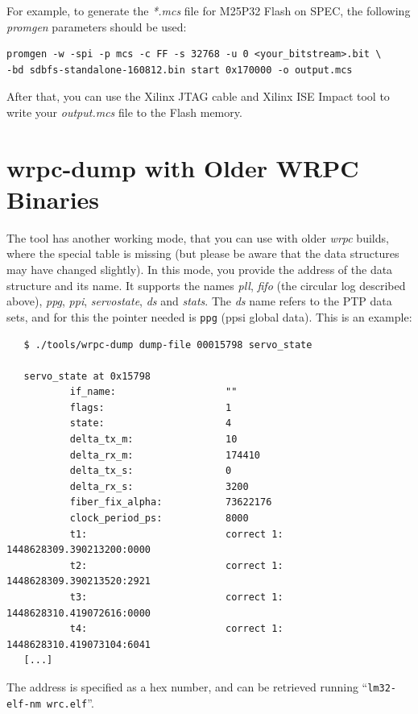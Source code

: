 \documentclass[a4paper, 12pt]{article}
\renewcommand{\_}{\underscore\allowbreak}
\begin{document}
For example, to generate the \textit{*.mcs} file for M25P32 Flash on SPEC, the
following \textit{promgen} parameters should be used:
\begin{lstlisting}
promgen -w -spi -p mcs -c FF -s 32768 -u 0 <your_bitstream>.bit \
-bd sdbfs-standalone-160812.bin start 0x170000 -o output.mcs
\end{lstlisting}

After that, you can use the Xilinx JTAG cable and Xilinx ISE Impact tool to
write your \textit{output.mcs} file to the Flash memory.
\newpage
\section{wrpc-dump with Older WRPC Binaries}
\label{appendix:wrpc_dump_with_Older_WRPC_Binaries}

The tool has another working mode, that you can use with older
\textit{wrpc} builds, where the special table is missing (but please be
aware that the data structures may have changed slightly).  In this
mode, you provide the address of the data structure and its name. It
supports the names \textit{pll}, \textit{fifo} (the circular log described
above), \textit{ppg}, \textit{ppi}, \textit{servo\_state}, \textit{ds} and
\textit{stats}. The \textit{ds} name
refers to the PTP data sets, and for this the pointer needed is
\texttt{ppg} (ppsi global data).
This is an example:

\begin{lstlisting}
   $ ./tools/wrpc-dump dump-file 00015798 servo_state

   servo_state at 0x15798
           if_name:                   ""
           flags:                     1
           state:                     4
           delta_tx_m:                10
           delta_rx_m:                174410
           delta_tx_s:                0
           delta_rx_s:                3200
           fiber_fix_alpha:           73622176
           clock_period_ps:           8000
           t1:                        correct 1: 1448628309.390213200:0000
           t2:                        correct 1: 1448628309.390213520:2921
           t3:                        correct 1: 1448628310.419072616:0000
           t4:                        correct 1: 1448628310.419073104:6041
   [...]
\end{lstlisting}

The address is specified as a hex number, and can be retrieved running
``\texttt{lm32-elf-nm  wrc.elf}''.
\end{document}
